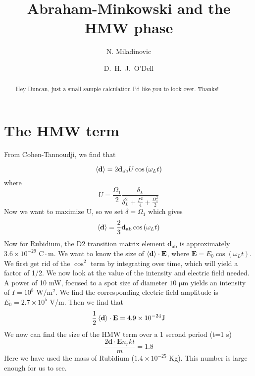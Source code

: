 \documentclass[twocolumn,english,pra,aps,superscriptaddress,floatfix]{revtex4-1}
\begin{document}
\author{N. Miladinovic}
\author{D.\ H.\ J.\ O'Dell}

\title{Abraham-Minkowski and the HMW phase}

\begin{abstract}
\label{sec:abstract}
Hey Duncan, just a small sample calculation I'd like you to look over.  Thanks!
\end{abstract}


\maketitle

\section{The HMW term}
\label{sec:hmw}

From Cohen-Tannoudji, we find that 

\begin{equation}
\braket{\mathbf{d}}=2\mathbf{d}_{\mathrm{ab}}U\cos\left(\omega_L t\right)
\end{equation}
where
\begin{equation}
U=\frac{\Omega_1}{2}\frac{\delta_L}{\delta_L^2+\frac{\Gamma^2}{4}+\frac{\Omega_1^2}{2}}
\end{equation}
Now we want to maximize U, so we set $\delta=\Omega_1$ which gives
\begin{equation}
\braket{\mathbf{d}}=\frac{2}{3}\mathbf{d}_{\mathrm{ab}}\cos\left(\omega_L t\right)
\end{equation}
Now for Rubidium, the D2 transition matrix element $\mathbf{d}_{\mathrm{ab}}$ is approximately $3.6\times 10^{-29}$ $\mathrm{C\cdot m}$.  We want to know the size of $\braket{\mathbf{d}}\cdot \mathbf{E}$, where $\mathbf{E}=E_0\cos\left(\omega_L t\right)$.
  We first get rid of the $\cos^2$ term by integrating over time, which will yield a factor of 1/2.  
We now look at the value of the intensity and electric field needed. A power of 10 mW, focused to a spot size of diameter $10$ $\mathrm{\mu m}$  yields an intensity  of $I=10^8$ $\mathrm{W/m^2}$.  We find the corresponding electric field amplitude is $E_0=2.7\times10^5$ V/m.
Then we find that
\begin{equation}
\frac{1}{2}\braket{\mathbf{d}}\cdot \mathbf{E}=4.9\times 10^{-24} \mathrm{J}
\end{equation}
We now can find the size of the HMW term over a 1 second period (t=1 s)
\begin{equation}
\frac{2\mathbf{d}\cdot \mathbf{E}n_r kt}{m}=1.8
\end{equation}
Here we have used the mass of Rubidium ($1.4\times 10^{-25}$ Kg).  This number is large enough for us to see.
\end{document}
